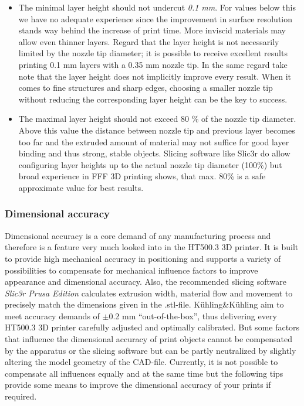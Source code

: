 \begin{itemize}
  \item The minimal layer height should not undercut \emph{0.1 mm}. 
        For values below this we have 
        no adequate experience since the improvement in surface resolution stands way behind the increase of print time. More inviscid materials may allow even thinner layers.
        Regard that the layer height is not necessarily limited by the nozzle tip diameter; it is possible to receive excellent results printing 0.1 mm layers with a 0.35 mm nozzle tip. In the same regard take note that the layer height does not implicitly improve every result. When it comes to fine structures and sharp edges, choosing a smaller nozzle tip without reducing the corresponding layer height can be the key to success.
  \item The maximal layer height should not exceed 80 \% of the nozzle tip diameter. Above 
        this value the distance between nozzle tip and previous layer becomes too far and the extruded amount of material may not suffice for good layer binding and thus strong, stable objects.
        Slicing software like Slic3r do allow configuring layer heights up to the actual nozzle tip diameter (100\%) but broad experience in FFF 3D printing shows, that max. 80\% is a safe approximate value for best results.  
\end{itemize} 


\subsubsection{Dimensional accuracy}

Dimensional accuracy is a core demand of any manufacturing process and therefore is a feature very much looked into in the HT500.3 3D printer. It is built to provide high mechanical accuracy in positioning and supports a variety of possibilities to compensate for mechanical influence factors to improve appearance and dimensional accuracy.
Also, the recommended slicing software \emph{Slic3r Prusa Edition} calculates extrusion width, material flow and movement to precisely match the dimensions given in the .stl-file.
Kühling\&Kühling aim to meet accuracy demands of $\pm$0.2 mm “out-of-the-box”, thus delivering every HT500.3 3D printer carefully adjusted and optimally calibrated.
But some factors that influence the dimensional accuracy of print objects cannot be compensated by the apparatus or the slicing software but can be partly neutralized by slightly altering the model geometry of the CAD-file.
Currently, it is not possible to compensate all influences equally and at the same time but the following tips provide some means to improve the dimensional accuracy of your prints if required. 

